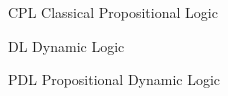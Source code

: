 \begin{siglas}
  \item[CPL] Classical Propositional Logic
  \item[DL] Dynamic Logic
  \item[PDL] Propositional Dynamic Logic
\end{siglas}